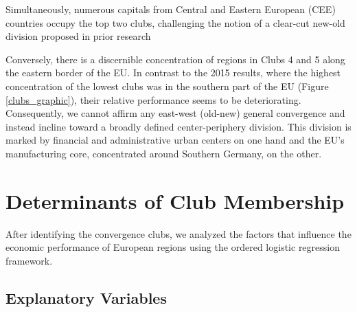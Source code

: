 \documentclass[11pt]{article}
\begin{document}
Simultaneously, numerous capitals from Central and Eastern European (CEE) countries occupy the top two clubs, challenging the notion of a clear-cut new-old division proposed in prior research \citep{eckey2007convergence}

Conversely, there is a discernible concentration of regions in Clubs 4 and 5 along the eastern border of the EU. In contrast to the 2015 results, where the highest concentration of the lowest clubs was in the southern part of the EU (Figure \ref{clubs_graphic}), their relative performance seems to be deteriorating. Consequently, we cannot affirm any east-west (old-new) general convergence and instead incline toward a broadly defined center-periphery division. This division is marked by financial and administrative urban centers on one hand and the EU's manufacturing core, concentrated around Southern Germany, on the other.

\section{Determinants of Club Membership}
\label{Determinants of club membership}

After identifying the convergence clubs, we analyzed the factors that influence the economic performance of European regions using the ordered logistic regression framework.

\subsection{Explanatory Variables}
\end{document}
